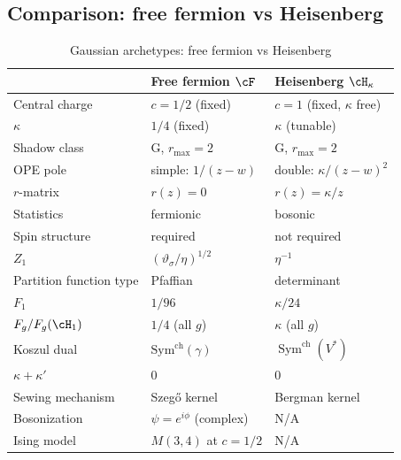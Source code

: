 \subsection{Comparison: free fermion vs Heisenberg}
\label{subsec:fermion-heisenberg-comparison}

\begin{table}[ht]
\centering
\caption{Gaussian archetypes: free fermion vs Heisenberg}
\label{tab:fermion-heisenberg-comparison}
\begin{tabular}{lll}
\toprule
& \textbf{Free fermion} $\cF$ & \textbf{Heisenberg} $\cH_\kappa$ \\
\midrule
Central charge & $c = 1/2$ (fixed) & $c = 1$ (fixed, $\kappa$ free) \\
$\kappa$ & $1/4$ (fixed) & $\kappa$ (tunable) \\
Shadow class & G, $r_{\max} = 2$ & G, $r_{\max} = 2$ \\
OPE pole & simple: $1/(z{-}w)$ & double: $\kappa/(z{-}w)^2$ \\
$r$-matrix & $r(z) = 0$ & $r(z) = \kappa/z$ \\
Statistics & fermionic & bosonic \\
Spin structure & required & not required \\
$Z_1$ & $(\vartheta_\sigma/\eta)^{1/2}$ & $\eta^{-1}$ \\
Partition function type & Pfaffian & determinant \\
$F_1$ & $1/96$ & $\kappa/24$ \\
$F_g/F_g(\cH_1)$ & $1/4$ (all $g$) & $\kappa$ (all $g$) \\
Koszul dual & $\mathrm{Sym}^{\mathrm{ch}}(\gamma)$ & $\operatorname{Sym}^{\mathrm{ch}}(V^*)$ \\
$\kappa + \kappa'$ & $0$ & $0$ \\
Sewing mechanism & Szeg\H{o} kernel & Bergman kernel \\
Bosonization & $\psi = e^{i\phi}$ (complex) & N/A \\
Ising model & $M(3,4)$ at $c = 1/2$ & N/A \\
\bottomrule
\end{tabular}
\end{table}

